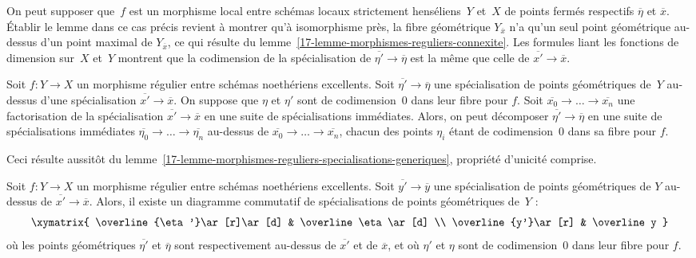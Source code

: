 \documentclass[10pt]{../fichiers-configuration-latex/smfart}
\begin{document}
On peut supposer que $f$ est un morphisme local entre schémas locaux
strictement henséliens $Y$ et $X$ de points fermés respectifs
$\overline\eta$ et $\overline x$. Établir le lemme dans ce cas précis
revient à montrer qu'à isomorphisme près, la fibre géométrique
$Y_{\overline x}$ n'a qu'un seul point géométrique au-dessus d'un point
maximal de $Y_{\overline x}$, ce qui résulte du 
lemme~\ref{17-lemme-morphismes-reguliers-connexite}.
Les formules liant les fonctions de dimension sur $X$ et $Y$ montrent que
la codimension de la spécialisation de 
$\overline{\eta'}\to\overline\eta$ est la même que celle de 
$\overline{x'}\to\overline{x}$.

\begin{lemme3}\label{17-lemme-morphismes-reguliers-relevement-specialisations}
Soit $f\colon Y\to X$ un morphisme régulier
entre schémas noethériens excellents. Soit
$\overline{\eta'}\to\overline\eta$ une spécialisation de points
géométriques de $Y$ au-dessus d'une spécialisation
$\overline{x'}\to\overline{x}$. On suppose que $\eta$ et $\eta'$ sont de
codimension $0$ dans leur fibre pour $f$. Soit
$\overline{x_0}\to\dots\to\overline{x_n}$ une factorisation de la
spécialisation $\overline{x'}\to\overline{x}$ en une suite de
spécialisations immédiates. Alors, on peut décomposer
$\overline{\eta'}\to\overline\eta$ en une suite de spécialisations
immédiates $\overline{\eta_0}\to\dots\to\overline{\eta_n}$ au-dessus de 
$\overline{x_0}\to\dots\to\overline{x_n}$, chacun des points $\eta_i$ étant
de codimension $0$ dans sa fibre pour $f$.
\end{lemme3}

Ceci résulte aussitôt du
lemme~\ref{17-lemme-morphismes-reguliers-specialisations-generiques},
propriété d'unicité comprise.

\begin{lemme3}\label{17-lemme-morphismes-reguliers-generisation-specialisations}
Soit $f\colon Y\to X$ un morphisme régulier
entre schémas noethériens excellents. Soit
$\overline{y'}\to\overline{y}$ une spécialisation de points géométriques de
$Y$ au-dessus de $\overline{x'}\to\overline x$.
Alors, il existe un diagramme commutatif de spécialisations de points
géométriques de $Y$ :
\[
\xymatrix{
\overline{\eta'}\ar[r]\ar[d] & \overline\eta\ar[d] \\
\overline{y'}\ar[r] & \overline y
}
\]
où les points géométriques $\overline{\eta'}$ et $\overline{\eta}$ sont
respectivement au-dessus de $\overline{x'}$ et de $\overline x$, et où
$\eta'$ et $\eta$ sont de codimension $0$ dans leur fibre pour $f$.
\end{lemme3}
\end{document}
